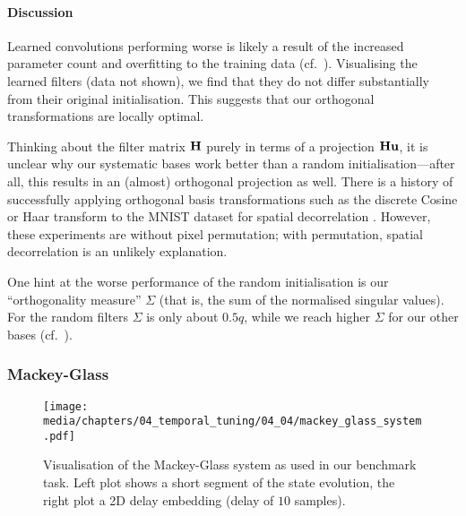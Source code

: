 \paragraph{Discussion}
Learned convolutions performing worse is likely a result of the increased parameter count and overfitting to the training data (cf.~).
Visualising the learned \FIR filters (data not shown), we find that they do not differ substantially from their original initialisation.
This suggests that our orthogonal transformations are locally optimal.

Thinking about the \FIR filter matrix $\mathbf{H}$ purely in terms of a projection $\mathbf{H} \mathbf{u}$, it is unclear why our systematic bases work better than a random initialisation---after all, this results in an (almost) orthogonal projection as well.
There is a history of successfully applying orthogonal basis transformations such as the discrete Cosine or Haar transform to the MNIST dataset for spatial decorrelation \citep{baldominos2019survey}.
However, these experiments are without pixel permutation; with permutation, spatial decorrelation is an unlikely explanation.

One hint at the worse performance of the random initialisation is our \enquote{orthogonality measure} $\Sigma$ (that is, the sum of the normalised singular values).
For the random \FIR filters $\Sigma$ is only about $0.5q$, while we reach higher $\Sigma$ for our other bases (cf.~).


\subsubsection{Mackey-Glass}

\begin{figure}
	\texttt{[image: media/chapters/04\_temporal\_tuning/04\_04/mackey\_glass\_system.pdf]}
	\caption[Visualisation of the Mackey-Glass system]{Visualisation of the Mackey-Glass system as used in our benchmark task.
	Left plot shows a short segment of the state evolution, the right plot a 2D delay embedding (delay of $10$ samples).
	}
	\label{fig:mackey_glass_system}
\end{figure}

